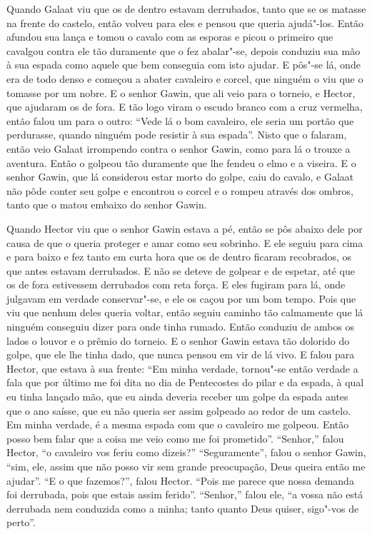 Quando Galaat viu que os de dentro estavam derrubados, tanto que se os matasse
na frente do castelo, então volveu para eles e pensou que queria ajudá"-los.
Então afundou sua lança e tomou o cavalo com as esporas e picou o primeiro que
cavalgou contra ele tão duramente que o fez abalar"-se, depois conduziu sua mão
à sua espada como aquele que bem conseguia com isto ajudar. E pôs"-se lá, onde
era de todo denso e começou a abater cavaleiro e corcel, que ninguém o viu que
o tomasse por um nobre. E o senhor Gawin, que ali veio para o torneio, e
Hector, que ajudaram os de fora. E tão logo viram o escudo branco com a cruz
vermelha, então falou um para o outro: “Vede lá o bom cavaleiro, ele seria um
portão que perdurasse, quando ninguém pode resistir à sua espada”. Nisto que o
falaram, então veio Galaat irrompendo contra o senhor Gawin, como para lá o
trouxe a aventura. Então o golpeou tão duramente que lhe fendeu o elmo e a
viseira. E o senhor Gawin, que lá considerou estar morto do golpe, caiu do
cavalo, e Galaat não pôde conter seu golpe e encontrou o corcel e o rompeu
através dos ombros, tanto que o matou embaixo do senhor Gawin.

Quando Hector viu que o senhor Gawin estava a pé, então se pôs abaixo dele por
causa de que o queria proteger e amar como seu sobrinho. E ele seguiu para cima
e para baixo e fez tanto em curta hora que os de dentro ficaram recobrados, os
que antes estavam derrubados. E não se deteve de golpear e de espetar, até que
os de fora estivessem derrubados com reta força. E eles fugiram para lá, onde
julgavam em verdade conservar"-se, e ele os caçou por um bom tempo. Pois que viu
que nenhum deles queria voltar, então seguiu caminho tão calmamente que lá
ninguém conseguiu dizer para onde tinha rumado. Então conduziu de ambos os
lados o louvor e o prêmio do torneio. E o senhor Gawin estava tão dolorido do
golpe, que ele lhe tinha dado, que nunca pensou em vir de lá vivo. E falou para
Hector, que estava à sua frente: “Em minha verdade, tornou"-se então verdade a
fala que por último me foi dita no dia de Pentecostes do pilar e da espada, à
qual eu tinha lançado mão, que eu ainda deveria receber um golpe da espada
antes que o ano saísse, que eu não queria ser assim golpeado ao redor de um
castelo. Em minha verdade, é a mesma espada com que o cavaleiro me golpeou.
Então posso bem falar que a coisa me veio como me foi prometido”. “Senhor,”
falou Hector, “o cavaleiro vos feriu como dizeis?” “Seguramente”, falou o
senhor Gawin, “sim, ele, assim que não posso vir sem grande preocupação, Deus
queira então me ajudar”. “E o que fazemos?”, falou Hector. “Pois me parece que
nossa demanda foi derrubada, pois que estais assim ferido”. “Senhor,” falou
ele, “a vossa não está derrubada nem conduzida como a minha; tanto quanto Deus
quiser, sigo"-vos de perto”. 

